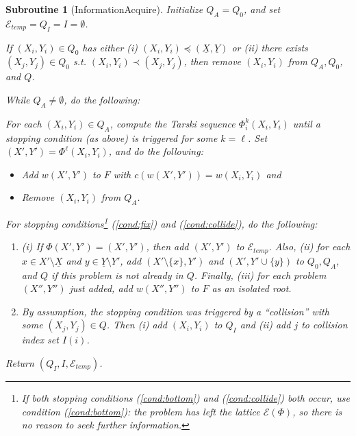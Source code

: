 \documentclass[11pt,reqno]{amsart}
\newtheorem{subroutine}[thm]{Subroutine}
\theoremstyle{definition}
\numberwithin{equation}{section}
\newcommand{\ul}{\underline}
\newcommand{\fix}{\mathcal{E}}
\newcommand{\peq}{\preceq}
\newcommand{\pe}{\prec}
\newcommand{\acto}{Q_0}
\newcommand{\acta}{Q_A}
\newcommand{\actc}{Q_I}
\newcommand{\act}{Q}
\newcommand{\coll}{I}
\newcommand{\forest}{F}
\newcommand{\fixtemp}{\mathcal{E}_{temp}}
\newcommand{\botx}{\ul{X}}
\newcommand{\boty}{\ul{Y}}
\newcommand{\pairi}{(X_i,Y_i)}
\newcommand{\pairp}{(X',Y')}
\begin{document}
\begin{subroutine}[InformationAcquire] \label{sub:infac2}
Initialize $\acta = \acto$, and set $\fixtemp = \actc = \coll = \emptyset$.

If $(X_i,Y_i) \in \acto$ has either (i) $(X_i, Y_i) \peq (\botx,\boty)$ or (ii) there exists $(X_j, Y_j) \in \acto$ s.t. $(X_i,Y_i) \pe (X_j,Y_j)$, then remove $(X_i,Y_i)$ from $\acta, \acto$, and $\act$.

While $\acta \not = \emptyset$, do the following:

For each $\pairi \in \acta$, compute the Tarski sequence $\Phi_i^k \pairi$ until a stopping condition (as above) is triggered for some $k = \ell$. 
Set $\pairp = \Phi^{\ell}\pairi$, and do the following:
\begin{itemize}
\item[(a)] Add $w\pairp$ to $\forest$ with $c(w\pairp) = w\pairi$ and 
\item[(b)] Remove $\pairi$ from $\acta$. 
\end{itemize}
For stopping conditions\footnote{If both stopping conditions (\ref{cond:bottom}) and (\ref{cond:collide}) both occur, use condition (\ref{cond:bottom}): the problem has left the lattice $\fix(\Phi)$, so there is no reason to seek further information.} (\ref{cond:fix}) and (\ref{cond:collide}), do the following:
\begin{enumerate}
\item[(\ref{cond:fix})] (i) If $\Phi \pairp = \pairp$, then add $\pairp$ to $\fixtemp$. 
Also, (ii) for each $x \in X' \setminus \botx$ and $y \in \boty \setminus Y'$, add $(X' \setminus \{x\}, Y')$ and $(X', Y' \cup \{y \})$ to $\acto, \acta$, and $\act$ if this problem is not already in $\act$.
Finally, (iii) for each problem $(X'',Y'')$ just added, add $w(X'',Y'')$ to $\forest$ as an isolated root.
\item[(\ref{cond:collide})] By assumption, the stopping condition was triggered by a ``collision'' with some $(X_j,Y_j) \in \act$.
Then (i) add $\pairi$ to $\actc$ and (ii) add $j$ to collision index set $\coll(i)$. 
\end{enumerate}

Return $(\actc, \coll, \fixtemp)$.
\end{subroutine}
\end{document}
